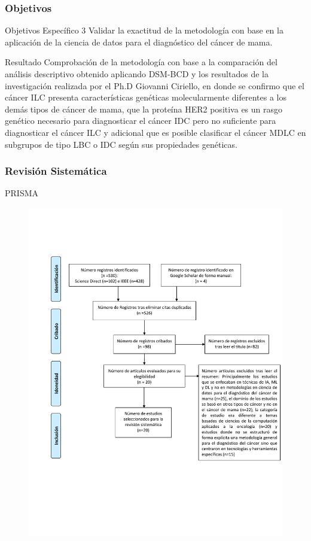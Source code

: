 \documentclass[xcolor=dvipsnames,xcolor=table,10pt]{beamer} %
\begin{document}
\begin{frame}
	\frametitle{Objetivos}
	\begin{block}{Objetivos Específico 3}\justifying
		Validar la exactitud de la metodología con base en la aplicación de la ciencia de datos para el diagnóstico del cáncer de mama.	
	\end{block}
	
	\begin{exampleblock}{Resultado}
		\justifying	
		Comprobación de la metodología con base a la comparación del análisis descriptivo obtenido aplicando DSM-BCD  y los resultados de la investigación realizada por el Ph.D Giovanni Ciriello, en donde se confirmo que el cáncer ILC presenta características genéticas molecularmente diferentes a los demás tipos de cáncer de mama, que  la proteína HER2 positiva es un rasgo genético necesario para diagnosticar el cáncer IDC pero no suficiente para diagnosticar el cáncer ILC y adicional que es posible clasificar el cáncer MDLC en subgrupos de tipo LBC o IDC según sus propiedades genéticas.
	\end{exampleblock}
\end{frame}

\begin{frame}
	\frametitle{Revisión Sistemática}{PRISMA}
	\begin{figure}[h!]
		\centering
		\includegraphics[width=0.65\linewidth]{IMAGENES/PRISMA_DIAGRAM}
	\end{figure}
\end{frame}
\end{document}
